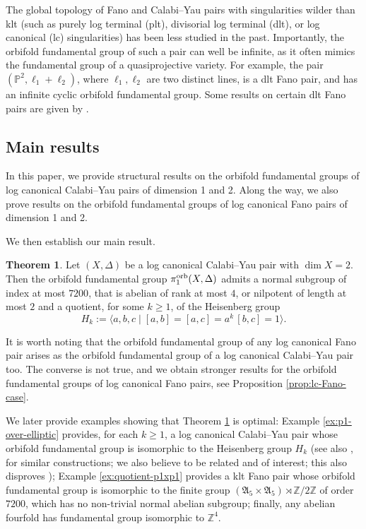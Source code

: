 \documentclass{amsart}
\newcommand{\zz}{\mathbb{Z}}
\theoremstyle{definition}
\newtheorem{alphtheorem}{Theorem}
\theoremstyle{remark}
\numberwithin{equation}{section}
\begin{document}
The global topology of Fano and Calabi--Yau pairs with singularities wilder than klt (such as purely log terminal (plt), divisorial log terminal (dlt), or log canonical (lc) singularities) has been less studied in the past. Importantly, the orbifold fundamental group of such a pair can well be infinite, as it often mimics the fundamental group of a quasiprojective variety. For example, the pair $(\mathbb{P}^2,\ell_1+\ell_2)$, where $\ell_1,\ell_2$ are two distinct lines, is a dlt Fano pair, and has an infinite cyclic orbifold fundamental group. Some results on certain dlt Fano pairs are given by \cite[Proposition 7.10]{KM99}.

\subsection{Main results}
In this paper, we provide structural results on the orbifold fundamental groups of log canonical Calabi--Yau pairs of dimension 1 and 2. Along the way, we also prove results on the orbifold fundamental groups of log canonical Fano pairs of dimension 1 and 2.

We then establish our main result.

\begin{alphtheorem}\label{introthm:fun-group-lcy}
Let $(X,\Delta)$ be a log canonical Calabi--Yau pair with $\dim X =2$. Then the orbifold fundamental group $\pi_1^{\rm orb}(X,\Delta)$ admits a normal subgroup of index at most $7200$, that is abelian of rank at most $4$, or nilpotent of length at most $2$ and a quotient, for some $k\ge 1$, of the Heisenberg group
$$H_k:=\langle a,b,c\mid [a,b]=[a,c]=a^k\, [b,c] = 1\rangle.$$
\end{alphtheorem}

It is worth noting that the orbifold fundamental group of any log canonical Fano pair arises as the orbifold fundamental group of a log canonical Calabi--Yau pair too. The converse is not true, and we obtain stronger results for the orbifold fundamental groups of log canonical Fano pairs, see Proposition \ref{prop:lc-Fano-case}.

We later provide examples showing that Theorem \ref{introthm:fun-group-lcy} is optimal: Example \ref{ex:p1-over-elliptic} provides, for each $k\ge 1$, a log canonical Calabi--Yau pair whose orbifold fundamental group is isomorphic to the Heisenberg group $H_k$ (see also \cite[5.45]{HZ87}, \cite[Example 24]{AC23} for similar constructions; we also believe \cite[Question 26]{AC23} to be related and of interest; this also disproves \cite[Conjecture 4.46]{Mor22}); Example \ref{ex:quotient-p1xp1} provides a klt Fano pair whose orbifold fundamental group is isomorphic to the finite group $(\mathfrak{A}_5\times\mathfrak{A}_5)\rtimes\zz/2\zz$ of order $7200$, which has no non-trivial normal abelian subgroup; finally, any abelian fourfold has fundamental group isomorphic to $\zz^4$.
\end{document}
